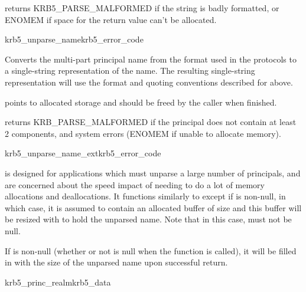  returns KRB5_PARSE_MALFORMED if the string is
 badly formatted, or ENOMEM if space for the return value can't be
allocated.

\begin{funcdecl}{krb5_unparse_name}{krb5_error_code}{\funcinout}
\funcin
{}
\funcout
{}
\end{funcdecl}

Converts the multi-part principal name  from the
format used in the protocols to a single-string representation of the
name.  The resulting single-string representation will use the format
and quoting conventions described for 
above.

 points to allocated storage and should be freed by the caller
when finished.

 returns {\sc KRB_PARSE_MALFORMED} if the principal
does not contain at least 2 components, and system errors ({\sc ENOMEM} if
unable to allocate memory).

\begin{funcdecl}{krb5_unparse_name_ext}{krb5_error_code}{\funcinout}
\funcin
{}
\funcinout
{}
\end{funcdecl}

 is designed for applications which
must unparse a large number of principals, and are concerned about the
speed impact of needing to do a lot of memory allocations and
deallocations.  It functions similarly to 
except if  is non-null, in which case, it is assumed
to contain an allocated buffer of size  and this
buffer will be resized with  to hold the unparsed
name.  Note that in this case,
 must not be null.  

If  is non-null (whether or not  is
null when the function is called), it will be filled in with the size
of the unparsed name upon successful return.

\begin{funcdecl}{krb5_princ_realm}{krb5_data}{\funcinout}
\end{funcdecl}

